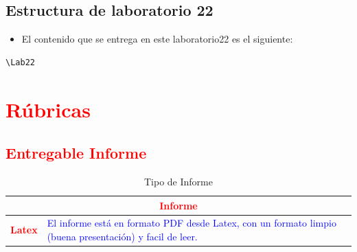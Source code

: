 \documentclass{article}
\begin{document}
	\subsection{Estructura de laboratorio 22}
	\begin{itemize}	
		\item El contenido que se entrega en este laboratorio22 es el siguiente:
	\end{itemize}
	\begin{lstlisting}[style=ascii-tree]
	\Lab22
	\end{lstlisting}    
	\section{\textcolor{red}{Rúbricas}}
	
	\subsection{\textcolor{red}{Entregable Informe}}
	\begin{table}[H]
		\caption{Tipo de Informe}
		\setlength{\tabcolsep}{0.5em} %
		{\renewcommand{\arraystretch}{1.5}%
		\begin{tabular}{|p{3cm}|p{12cm}|}
			\hline
			\multicolumn{2}{|c|}{\textbf{\textcolor{red}{Informe}}}  \\
			\hline 
			\textbf{\textcolor{red}{Latex}} & \textcolor{blue}{El informe está en formato PDF desde Latex,  con un formato limpio (buena presentación) y facil de leer.}   \\ 
			\hline 
			
			
		\end{tabular}
	}
	\end{table}
	
	\clearpage
	
\end{document}
